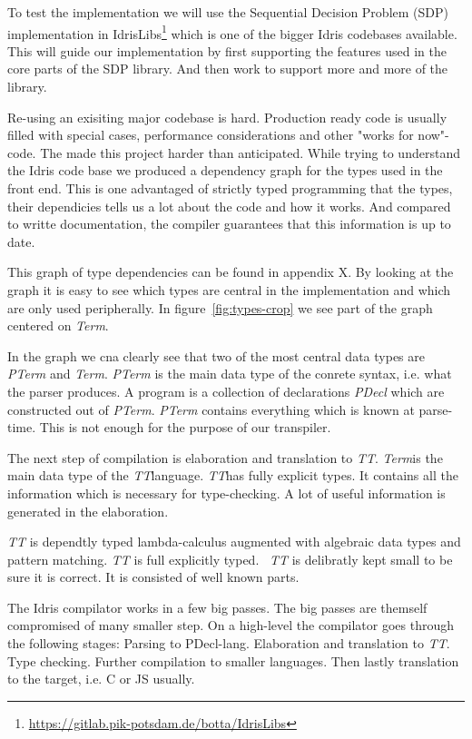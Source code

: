 To test the implementation we will use the Sequential Decision Problem (SDP)
implementation in
IdrisLibs\footnote{\url{https://gitlab.pik-potsdam.de/botta/IdrisLibs}} which
is one of the bigger Idris codebases available. This will guide our
implementation by first supporting the features used in the core parts of the
SDP library. And then work to support more and more of the library.


Re-using an exisiting major codebase is hard. Production ready code is usually
filled with special cases, performance considerations and other "works for
now"-code. The made this project harder than anticipated. While trying to
understand the Idris code base we produced a dependency graph for the types
used in the front end. This is one advantaged of strictly typed programming
that the types, their dependicies tells us a lot about the code and how it
works. And compared to writte documentation, the compiler guarantees that this
information is up to date.

\newcommand{\pterm}{\textit{PTerm}}
\newcommand{\pdecel}{\textit{PDecl}}
\newcommand{\term}{\textit{Term}}
\newcommand{\tti}{\textit{TT}}

This graph of type dependencies can be found in appendix X. By looking at the
graph it is easy to see which types are central in the implementation and which
are only used peripherally. In figure~\ref{fig:types-crop} we see part of the
graph centered on \textit{Term}.

In the graph we cna clearly see that two of the most central data types are
\textit{PTerm} and \textit{Term}. \textit{PTerm} is the main data type of the
conrete syntax, i.e. what the parser produces. A program is a collection of
declarations \textit{PDecl} which are constructed out of \pterm. \pterm
contains everything which is known at parse-time. This is not enough for the
purpose of our transpiler.

The next step of compilation is elaboration and translation to \tti. \term is
the main data type of the \tti language. \tti has fully explicit types. It
contains all the information which is necessary for type-checking. A lot of
useful information is generated in the elaboration.

\textit{TT} is dependtly typed lambda-calculus augmented with algebraic data
types and pattern matching. \textit{TT} is full explicitly typed.~\cite{idris}
\textit{TT} is delibratly kept small to be sure it is correct. It is consisted
of well known parts.

The Idris compilator works in a few big passes. The big passes are themself
compromised of many smaller step. On a high-level the compilator goes through
the following stages: Parsing to PDecl-lang. Elaboration and translation to
\textit{TT}. Type checking. Further compilation to smaller languages. Then
lastly translation to the target, i.e. C or JS usually.
